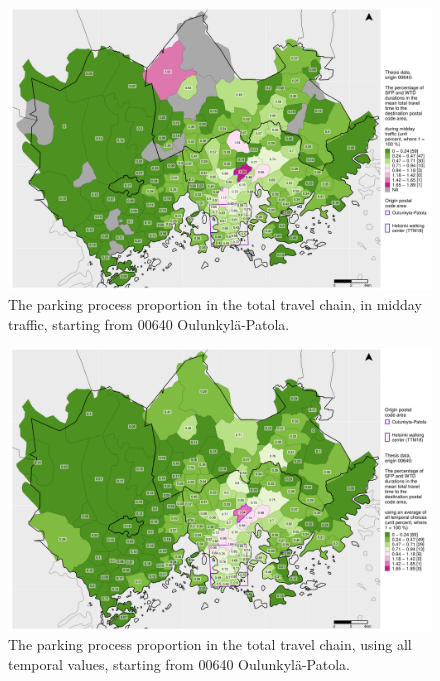 \begin{figure}[H]%
    \centering
    \includegraphics[trim={0.9cm 0.3cm 0.25cm 0.3cm},clip,width=\textwidth]{images/compare_traveltimes_mapfill-msc_m_pct_fromzip-00640_28-09-2020.png}
    \caption[Parking process proportion from Oulunkylä-Patola, midday traffic]{The parking process proportion in the total travel chain, in midday traffic, starting from 00640 Oulunkylä-Patola.}%
    \label{fig:compare_msc_m_pct_00640}%
\end{figure}

\begin{figure}[H]%
    \centering
    \includegraphics[trim={0.9cm 0.3cm 0.25cm 0.3cm},clip,width=\textwidth]{images/compare_traveltimes_mapfill-msc_all_pct_fromzip-00640_28-09-2020.png}
    \caption[Parking process proportion from Oulunkylä-Patola, all temporal values]{The parking process proportion in the total travel chain, using all temporal values, starting from 00640 Oulunkylä-Patola.}%
    \label{fig:compare_msc_all_pct_00640}%
\end{figure}

